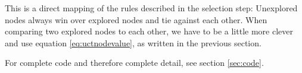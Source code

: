 This is a direct mapping of the rules described in the selection step: Unexplored nodes always win over explored nodes and tie against each other.
When comparing two explored nodes to each other, we have to be a little more clever and use equation \ref{eq:uctnodevalue}, as written in the previous section.





For complete code and therefore complete detail, see section \ref{sec:code}.
